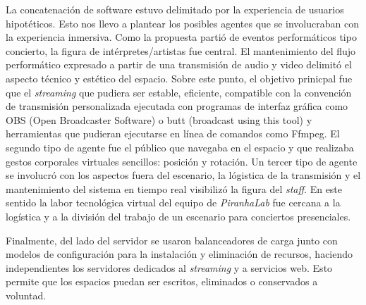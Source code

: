 

La concatenación de software estuvo delimitado por la experiencia de usuarios hipotéticos. Esto nos llevo a plantear los posibles agentes que se involucraban con la experiencia inmersiva. Como la propuesta partió de eventos performáticos tipo concierto, la figura de intérpretes/artistas fue central. El mantenimiento del flujo performático expresado a partir de una transmisión de audio y video delimitó el aspecto técnico y estético del espacio. Sobre este punto, el objetivo prinicpal fue que el \textit{streaming} que pudiera ser estable, eficiente, compatible con la convención de transmisión personalizada ejecutada con programas de interfaz gráfica como OBS (Open Broadcaster Software) o butt (broadcast using this tool) y herramientas que pudieran ejecutarse en línea de comandos como Ffmpeg. El segundo tipo de agente fue el público que navegaba en el espacio y que realizaba gestos corporales virtuales sencillos: posición y rotación. Un tercer tipo de agente se involucró con los aspectos fuera del escenario, la lógistica de la transmisión y el mantenimiento del sistema en tiempo real visibilizó la figura del \textit{staff}. En este sentido la labor tecnológica virtual del equipo de \textit{PiranhaLab} fue cercana a la logística y a la división del trabajo de un escenario para conciertos presenciales. 


Finalmente, del lado del servidor se usaron balanceadores de carga junto con modelos de configuración para la instalación y eliminación de recursos, haciendo independientes los servidores dedicados al \textit{streaming} y a servicios web. Esto permite que los espacios puedan ser escritos, eliminados o conservados a voluntad. 
